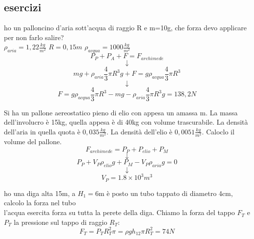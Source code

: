 \documentclass[a4paper,12pt, oneside]{book}
\begin{document}
\subsection{esercizi}
\begin{esercizio}
ho un palloncino d'aria sott'acqua di raggio R e m=10g, che forza devo applicare per non farlo salire? \\$\rho_{aria}=1,22 \frac{kg}{m^2}$ $R=0,15m$ $\rho_{acqua}=1000 \frac{kg}{m^2}$\\
$$P_P+P_A+F=F_{archimede}$$
$$\downarrow$$
$$mg+\rho_{aria}\frac{4}{3}\pi R^3g+F=g\rho_{acqua}\frac{4}{3}\pi R^3$$
$$\downarrow$$
$$F=g\rho_{acqua}\frac{4}{3}\pi R^3-mg-\rho_{aria}\frac{4}{3}\pi R^3g=138,2N$$
\end{esercizio}
\begin{esercizio}
Si ha un pallone aereostatico pieno di elio con appesa un amassa m. La massa dell'involucro è 15kg, quella appesa è di 40kg con volume trascurabile. La densità dell'aria in quella quota è $0,035 \frac{kg}{m^2}$. La densità dell'elio è $0,0051 \frac{kg}{m^2}$. Caloclo il volume del pallone.\\
$$F_{archimede}=P_P+P_{elio}+P_M$$
$$\downarrow$$
$$P_P+V_P\rho_{elio}g+P_M-V_P\rho_{aria}g=0$$
$$\downarrow$$
$$V_P=1.8\times 10^3 m^3$$
\end{esercizio}
\begin{esercizio}
ho una diga alta 15m, a $H_1=$6m è posto un tubo tappato di diametro 4cm, calcolo la forza nel tubo\\
l'acqua esercita forza su tutta la perete della diga. Chiamo la forza del tappo $F_T$ e $P_T$ la pressione sul tappo di raggio $R_T$:
$$F_T=P_TR_T^2\pi=\rho g h_12\pi R_T^2=74N$$
\end{esercizio}
\begin{esercizio}

\end{esercizio}
\newpage
\end{document}
